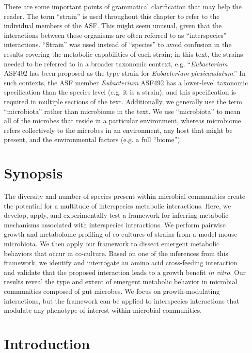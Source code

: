 \documentclass[11pt,twocolumn,notitlepage,openany,twoside]{book}
\begin{document}
\begin{refsection}
There are some important points of grammatical clarification that may help the reader. The term ``strain'' is used throughout this chapter to refer to the individual members of the ASF. This might seem unusual, given that the interactions between these organisms are often referred to as ``interspecies'' interactions. ``Strain'' was used instead of ``species'' to avoid confusion in the results covering the metabolic capabilities of each strain; in this text, the strains needed to be referred to in a broader taxonomic context, e.g. ``\textit{Eubacterium} ASF492 has been proposed as the type strain for \textit{Eubacterium plexicaudatum}.'' In such contexts, the ASF member \textit{Eubacterium} ASF492 has a lower-level taxonomic specification than the species level (e.g. it is a strain), and this specification is required in multiple sections of the text. Additionally, we generally use the term ``microbiota'' rather than microbiome in the text. We use ``microbiota'' to mean all of the microbes that reside in a particular environment, whereas microbiome refers collectively to the microbes in an environment, any host that might be present, and the environmental factors (e.g. a full ``biome'').

\section{Synopsis}

The diversity and number of species present within microbial communities create the potential for a multitude of interspecies metabolic interactions. Here, we develop, apply, and experimentally test a framework for inferring metabolic mechanisms associated with interspecies interactions. We perform pairwise growth and metabolome profiling of co-cultures of strains from a model mouse microbiota. We then apply our framework to dissect emergent metabolic behaviors that occur in co-culture. Based on one of the inferences from this framework, we identify and interrogate an amino acid cross-feeding interaction and validate that the proposed interaction leads to a growth benefit \textit{in vitro}. Our results reveal the type and extent of emergent metabolic behavior in microbial communities composed of gut microbes. We focus on growth-modulating interactions, but the framework can be applied to interspecies interactions that modulate any phenotype of interest within microbial communities.

\section{Introduction}


\end{refsection}
\end{document}
